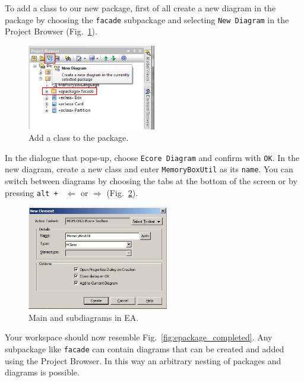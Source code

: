 To add a class to our new package, first of all create a new diagram in
the package by choosing the \texttt{facade} subpackage and selecting \texttt{New
Diagram} in the Project Browser (Fig.~\ref{fig:epackage_newelement}).

\begin{figure}[htbp]
	\centering
  \includegraphics[width=0.5\textwidth]{pics/memBox19}
	\caption{Add a class to the package.}
	\label{fig:epackage_newelement}
\end{figure}

In the dialogue that pops-up, choose \texttt{Ecore Diagram} and confirm with
\texttt{OK}.
In the new diagram, create a new class and enter \texttt{MemoryBoxUtil} as its
\texttt{name}.  You can switch between diagrams by choosing the tabs at the
bottom of the screen or by pressing \texttt{alt + } $\Leftarrow$ or
$\Rightarrow$ (Fig.~\ref{fig:epackage_newdiagram}). 

\begin{figure}[htbp] 
	\centering
  \includegraphics[width=0.55\textwidth]{pics/memBox20}
	\caption{Main and subdiagrams in EA.}
	\label{fig:epackage_newdiagram}
\end{figure}
\clearpage 

Your workspace should now resemble Fig.~\ref{fig:epackage_completed}.
Any subpackage like \texttt{facade} can contain diagrams that can be
created and added using the Project Browser. 
In this way an arbitrary nesting of packages and diagrams is possible.

